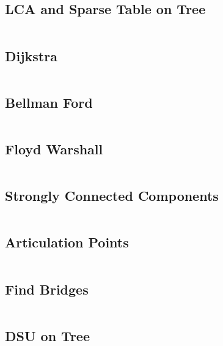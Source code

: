 \subsection{\small LCA and Sparse Table on Tree  \scriptsize}
\inputminted[breaklines, breakanywhere]{c++}{code/07-Graph Theory/02-LCA and Sparse Table on Tree.cpp}

\subsection{\small Dijkstra  \scriptsize}
\inputminted[breaklines, breakanywhere]{c++}{code/07-Graph Theory/03-Dijkstra.cpp}

\subsection{\small Bellman Ford  \scriptsize}
\inputminted[breaklines, breakanywhere]{c++}{code/07-Graph Theory/04-Bellman Ford.cpp}

\subsection{\small Floyd Warshall  \scriptsize}
\inputminted[breaklines, breakanywhere]{c++}{code/07-Graph Theory/05-Floyd Warshall.cpp}

\subsection{\small Strongly Connected Components  \scriptsize}
\inputminted[breaklines, breakanywhere]{c++}{code/07-Graph Theory/06-Strongly Connected Components.cpp}

\subsection{\small Articulation Points  \scriptsize}
\inputminted[breaklines, breakanywhere]{c++}{code/07-Graph Theory/07-Articulation Points.cpp}

\subsection{\small Find Bridges  \scriptsize}
\inputminted[breaklines, breakanywhere]{c++}{code/07-Graph Theory/08-Find Bridges.cpp}

\subsection{\small DSU on Tree  \scriptsize}
\inputminted[breaklines, breakanywhere]{c++}{code/07-Graph Theory/09-DSU on Tree.cpp}

